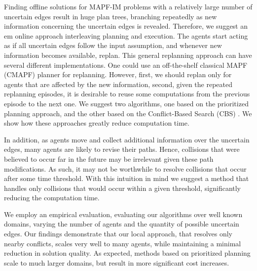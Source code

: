 \documentclass[letterpaper]{article} %
\def\
UrlFont{\rm}  %
\newcommand{\plan}[1]{\textbf{[\color{blue}PLAN:#1]}}
\theoremstyle{definition}
\begin{document}
Finding offline solutions for MAPF-IM problems with a relatively large number of uncertain edges result in huge plan trees, branching repeatedly as new information concerning the uncertain edges is revealed. Therefore, we suggest an {em online} approach interleaving planning and execution. The agents start acting as if all uncertain edges follow the input assumption, and whenever new information becomes available, replan. 
This general replanning approach can have several different implementations. One could use an off-the-shelf classical MAPF (CMAPF) planner for replanning. However, first, we should replan only for agents that are affected by the new information, second, given the repeated replanning episodes, it is desirable to reuse some computations from the previous episode to the next one. We suggest two algorithms, one based on the prioritized planning \cite{silver2005cooperative} approach, and the other based on the Conflict-Based Search (CBS) \cite{sharon2015conflict}. We show how these approaches greatly reduce computation time.

In addition, as agents move and collect additional information over the uncertain edges, many agents are likely to revise their paths. Hence, collisions that were believed to occur far in the future may be irrelevant given these path modifications. As such, it may not be worthwhile to resolve collisions that occur after some time threshold. With this intuition in mind we suggest a method that handles only collisions that would occur within a given threshold, significantly reducing the computation time. 

We employ an empirical evaluation, evaluating our algorithms over well known domains, varying the number of agents and the quantity of possible uncertain edges. 
Our findings demonstrate that our local approach, that resolves only nearby conflicts, scales very well to many agents, while maintaining a minimal reduction in solution quality. As expected, methods based on prioritized planning scale to much larger domains, but result in more significant cost increases.







\end{document}
